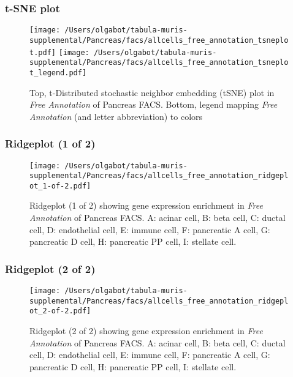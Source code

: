 \clearpage
\subsubsection{t-SNE plot}
\begin{figure}[h]
\centering
\texttt{[image: /Users/olgabot/tabula-muris-supplemental/Pancreas/facs/allcells\_free\_annotation\_tsneplot.pdf]}
\texttt{[image: /Users/olgabot/tabula-muris-supplemental/Pancreas/facs/allcells\_free\_annotation\_tsneplot\_legend.pdf]}
\caption{Top, t-Distributed stochastic neighbor embedding (tSNE) plot  in \emph{Free Annotation} of Pancreas FACS. Bottom, legend mapping \emph{Free Annotation} (and letter abbreviation) to colors}
\end{figure}


\clearpage

\subsubsection{Ridgeplot (1 of 2)}
\begin{figure}[h]
\centering
\texttt{[image: /Users/olgabot/tabula-muris-supplemental/Pancreas/facs/allcells\_free\_annotation\_ridgeplot\_1-of-2.pdf]}

\caption{ Ridgeplot (1 of 2)  showing gene expression enrichment in \emph{Free Annotation} of Pancreas FACS. A: acinar cell, B: beta cell, C: ductal cell, D: endothelial cell, E: immune cell, F: pancreatic A cell, G: pancreatic D cell, H: pancreatic PP cell, I: stellate cell.}
\end{figure}


\clearpage

\subsubsection{Ridgeplot (2 of 2)}
\begin{figure}[h]
\centering
\texttt{[image: /Users/olgabot/tabula-muris-supplemental/Pancreas/facs/allcells\_free\_annotation\_ridgeplot\_2-of-2.pdf]}

\caption{ Ridgeplot (2 of 2)  showing gene expression enrichment in \emph{Free Annotation} of Pancreas FACS. A: acinar cell, B: beta cell, C: ductal cell, D: endothelial cell, E: immune cell, F: pancreatic A cell, G: pancreatic D cell, H: pancreatic PP cell, I: stellate cell.}
\end{figure}


\clearpage


